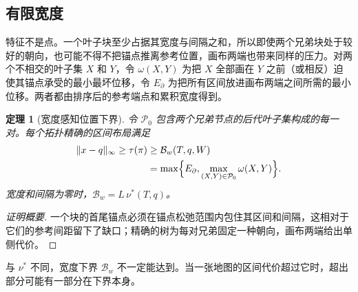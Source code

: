 \documentclass[preprint]{vgtc_zh}   %
\newtheorem{theorem}{定理}
\begin{document}
\subsection{有限宽度}
特征不是点。一个叶子块至少占据其宽度与间隔之和，所以即使两个兄弟块处于较好的朝向，也可能不得不把锚点推离参考位置，画布两端也带来同样的压力。对两个不相交的叶子集 $X$ 和 $Y$，令 $\omega(X,Y)$ 为把 $X$ 全部画在 $Y$ 之前（或相反）迫使其锚点承受的最小最坏位移，令 $E_\partial$ 为把所有区间放进画布两端之间所需的最小位移。两者都由排序后的参考端点和累积宽度得到。
\begin{theorem}[宽度感知位置下界]\label{thm:width}
令 $\mathcal{P}_0$ 包含两个兄弟节点的后代叶子集构成的每一对。每个拓扑精确的区间布局满足
\begin{equation}\label{eq:widthbound}
\begin{aligned}
 \|x-q\|_\infty\ge\tau(\pi)&\ge\mathcal{B}_w(T,q,W)\\
 &=\max\Bigl\{E_\partial,\max_{(X,Y)\in\mathcal{P}_0}\omega(X,Y)\Bigr\}.
\end{aligned}
\end{equation}
宽度和间隔为零时，$\mathcal{B}_w=L\,\nu^*(T,q)$。
\end{theorem}
\begin{proof}[证明概要]
一个块的首尾锚点必须在锚点松弛范围内包住其区间和间隔，这相对于它们的参考间距留下了缺口；精确的树为每对兄弟固定一种朝向，画布两端给出单侧代价。
\end{proof}
与 $\nu^*$ 不同，宽度下界 $\mathcal{B}_w$ 不一定能达到。当一张地图的区间代价超过它时，超出部分可能有一部分在下界本身。
\end{document}
